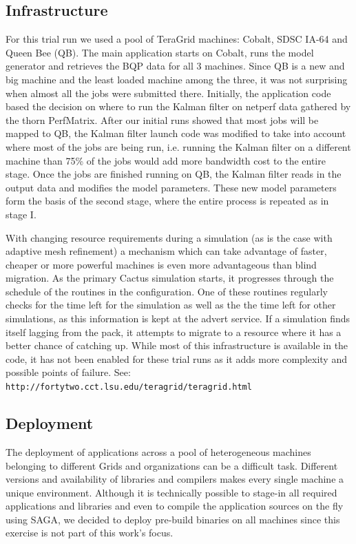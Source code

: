 \documentclass[conference,final]{IEEEtran}
\begin{document}
\subsection{Infrastructure}
For this trial run we used a pool of TeraGrid machines: Cobalt, SDSC
IA-64 and Queen Bee (QB). The main application starts on Cobalt, runs the
model generator and retrieves the BQP data for all 3 machines.  Since
QB is a new and big machine and the least loaded machine among
the three, it was not surprising when almost all the jobs were
submitted there.  Initially, the application code based the decision
on where to run the Kalman filter on netperf data gathered by the
thorn PerfMatrix. After our initial runs showed that most jobs will be
mapped to QB, the Kalman filter launch code was modified to
take into account where most of the jobs are being run, i.e. running
the Kalman filter on a different machine than 75\% of the jobs would
add more bandwidth cost to the entire stage. Once the jobs are
finished running on QB, the Kalman filter reads in the output
data and modifies the model parameters. These new model parameters
form the basis of the second stage, where the entire process is
repeated as in stage I.

With changing resource requirements during a simulation (as is the
case with adaptive mesh refinement) a mechanism which can take
advantage of faster, cheaper or more powerful machines is even more
advantageous than blind migration. As the primary Cactus simulation
starts, it progresses through the schedule of the routines in the
configuration. One of these routines regularly checks for the time
left for the simulation as well as the the time left for other
simulations, as this information is kept at the advert service. If a
simulation finds itself lagging from the pack, it attempts to migrate
to a resource where it has a better chance of catching up. While most
of this infrastructure is available in the code, it has not been
enabled for these trial runs as it adds more complexity and possible
points of failure.  See:\\
{\tt http://fortytwo.cct.lsu.edu/teragrid/teragrid.html}

\subsection{Deployment}

The deployment of applications across a pool of heterogeneous machines
belonging to different Grids and organizations can be a difficult
task. Different versions and availability of libraries and compilers
makes every single machine a unique environment. Although it is
technically possible to stage-in all required applications and
libraries and even to compile the application sources on the fly using
SAGA, we decided to deploy pre-build binaries on all machines since
this exercise is not part of this work's focus.
\end{document}
